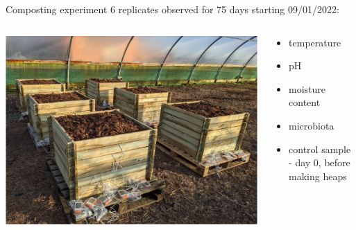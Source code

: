 \documentclass[mathserif,11pt]{beamer}
\begin{document}
\begin{frame}{Composting experiment}
6 replicates observed for 75 days starting 09/01/2022:\\
	\begin{columns}
	\begin{column}{0.5\textwidth}
		\centering
		\includegraphics[width=\textwidth]{Figures/heaps.jpg}\\
	\end{column}
	\begin{column}{0.5\textwidth}
	\centering
\begin{itemize}
	\item temperature
	\item pH
	\item moisture content
	\item microbiota
	\item control sample - day 0, before making heaps
\end{itemize}
	\end{column}
\end{columns}
\end{frame}
\end{document}
